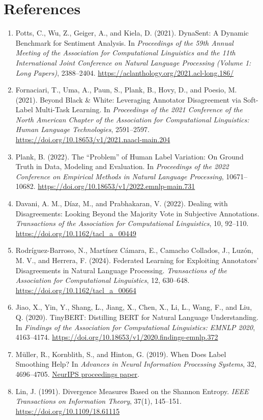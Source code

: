 \documentclass[11pt,a4paper]{article}
\begin{document}
\clearpage
\section*{References}
\small
\begin{enumerate}[leftmargin=*,itemsep=3pt]
\item Potts, C., Wu, Z., Geiger, A., and Kiela, D. (2021). DynaSent: A Dynamic Benchmark for Sentiment Analysis. In \textit{Proceedings of the 59th Annual Meeting of the Association for Computational Linguistics and the 11th International Joint Conference on Natural Language Processing (Volume 1: Long Papers)}, 2388--2404. \url{https://aclanthology.org/2021.acl-long.186/}
\item Fornaciari, T., Uma, A., Paun, S., Plank, B., Hovy, D., and Poesio, M. (2021). Beyond Black \& White: Leveraging Annotator Disagreement via Soft-Label Multi-Task Learning. In \textit{Proceedings of the 2021 Conference of the North American Chapter of the Association for Computational Linguistics: Human Language Technologies}, 2591--2597. \url{https://doi.org/10.18653/v1/2021.naacl-main.204}
\item Plank, B. (2022). The ``Problem'' of Human Label Variation: On Ground Truth in Data, Modeling and Evaluation. In \textit{Proceedings of the 2022 Conference on Empirical Methods in Natural Language Processing}, 10671--10682. \url{https://doi.org/10.18653/v1/2022.emnlp-main.731}
\item Davani, A. M., Díaz, M., and Prabhakaran, V. (2022). Dealing with Disagreements: Looking Beyond the Majority Vote in Subjective Annotations. \textit{Transactions of the Association for Computational Linguistics}, 10, 92--110. \url{https://doi.org/10.1162/tacl_a_00449}
\item Rodríguez-Barroso, N., Martínez Cámara, E., Camacho Collados, J., Luzón, M. V., and Herrera, F. (2024). Federated Learning for Exploiting Annotators' Disagreements in Natural Language Processing. \textit{Transactions of the Association for Computational Linguistics}, 12, 630--648. \url{https://doi.org/10.1162/tacl_a_00664}
\item Jiao, X., Yin, Y., Shang, L., Jiang, X., Chen, X., Li, L., Wang, F., and Liu, Q. (2020). TinyBERT: Distilling BERT for Natural Language Understanding. In \textit{Findings of the Association for Computational Linguistics: EMNLP 2020}, 4163--4174. \url{https://doi.org/10.18653/v1/2020.findings-emnlp.372}
\item Müller, R., Kornblith, S., and Hinton, G. (2019). When Does Label Smoothing Help? In \textit{Advances in Neural Information Processing Systems}, 32, 4696--4705. \href{https://proceedings.neurips.cc/paper/2019/hash/f1748d6b0fd9d439f71450117eba2725-Abstract.html}{NeurIPS proceedings paper}.
\item Lin, J. (1991). Divergence Measures Based on the Shannon Entropy. \textit{IEEE Transactions on Information Theory}, 37(1), 145--151. \url{https://doi.org/10.1109/18.61115}
\end{enumerate}
\end{document}
